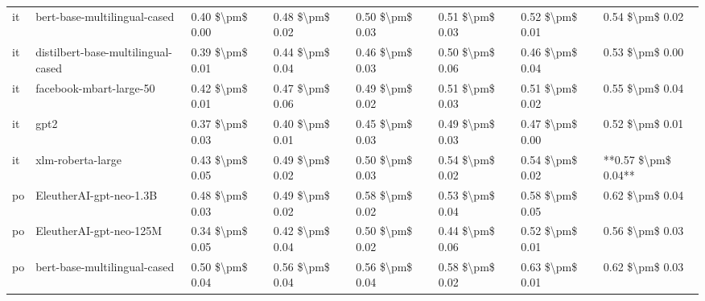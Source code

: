 \begin{tabular}{llllllll}
      it &       bert-base-multilingual-cased & 0.40 \$\textbackslash pm\$ 0.00 &           0.48 \$\textbackslash pm\$ 0.02 &       0.50 \$\textbackslash pm\$ 0.03 &        0.51 \$\textbackslash pm\$ 0.03 &                         0.52 \$\textbackslash pm\$ 0.01 &     0.54 \$\textbackslash pm\$ 0.02 \\
      it & distilbert-base-multilingual-cased & 0.39 \$\textbackslash pm\$ 0.01 &           0.44 \$\textbackslash pm\$ 0.04 &       0.46 \$\textbackslash pm\$ 0.03 &        0.50 \$\textbackslash pm\$ 0.06 &                         0.46 \$\textbackslash pm\$ 0.04 &     0.53 \$\textbackslash pm\$ 0.00 \\
      it &            facebook-mbart-large-50 & 0.42 \$\textbackslash pm\$ 0.01 &           0.47 \$\textbackslash pm\$ 0.06 &       0.49 \$\textbackslash pm\$ 0.02 &        0.51 \$\textbackslash pm\$ 0.03 &                         0.51 \$\textbackslash pm\$ 0.02 &     0.55 \$\textbackslash pm\$ 0.04 \\
      it &                               gpt2 & 0.37 \$\textbackslash pm\$ 0.03 &           0.40 \$\textbackslash pm\$ 0.01 &       0.45 \$\textbackslash pm\$ 0.03 &        0.49 \$\textbackslash pm\$ 0.03 &                         0.47 \$\textbackslash pm\$ 0.00 &     0.52 \$\textbackslash pm\$ 0.01 \\
      it &                  xlm-roberta-large & 0.43 \$\textbackslash pm\$ 0.05 &           0.49 \$\textbackslash pm\$ 0.02 &       0.50 \$\textbackslash pm\$ 0.03 &        0.54 \$\textbackslash pm\$ 0.02 &                         0.54 \$\textbackslash pm\$ 0.02 & **0.57 \$\textbackslash pm\$ 0.04** \\
      po &            EleutherAI-gpt-neo-1.3B & 0.48 \$\textbackslash pm\$ 0.03 &           0.49 \$\textbackslash pm\$ 0.02 &       0.58 \$\textbackslash pm\$ 0.02 &        0.53 \$\textbackslash pm\$ 0.04 &                         0.58 \$\textbackslash pm\$ 0.05 &     0.62 \$\textbackslash pm\$ 0.04 \\
      po &            EleutherAI-gpt-neo-125M & 0.34 \$\textbackslash pm\$ 0.05 &           0.42 \$\textbackslash pm\$ 0.04 &       0.50 \$\textbackslash pm\$ 0.02 &        0.44 \$\textbackslash pm\$ 0.06 &                         0.52 \$\textbackslash pm\$ 0.01 &     0.56 \$\textbackslash pm\$ 0.03 \\
      po &       bert-base-multilingual-cased & 0.50 \$\textbackslash pm\$ 0.04 &           0.56 \$\textbackslash pm\$ 0.04 &       0.56 \$\textbackslash pm\$ 0.04 &        0.58 \$\textbackslash pm\$ 0.02 &                         0.63 \$\textbackslash pm\$ 0.01 &     0.62 \$\textbackslash pm\$ 0.03 \\

\end{tabular}
